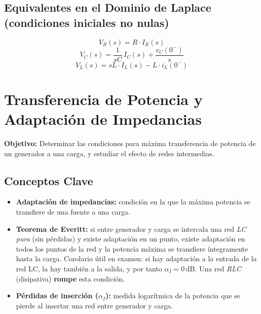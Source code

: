 \documentclass[12pt,a4paper]{article}
\begin{document}
\subsection{Equivalentes en el Dominio de Laplace (condiciones iniciales no nulas)}

\begin{formulabox}
\[
  V_R(s) = R\cdot I_R(s)
\]
\[
  V_C(s) = \frac{1}{sC}\,I_C(s) + \frac{v_C(0^-)}{s}
\]
\[
  V_L(s) = sL\cdot I_L(s) - L\cdot i_L(0^-)
\]
\end{formulabox}

\section{Transferencia de Potencia y Adaptación de Impedancias}

\textbf{Objetivo:} Determinar las condiciones para máxima transferencia de potencia
de un generador a una carga, y estudiar el efecto de redes intermedias.

\subsection{Conceptos Clave}

\begin{itemize}[leftmargin=1.5em, itemsep=4pt]
  \item \textbf{Adaptación de impedancias:} condición en la que la máxima potencia
        se transfiere de una fuente a una carga.

  \item \textbf{Teorema de Everitt:} si entre generador y carga se intercala una red
        \emph{LC pura} (sin pérdidas) y existe adaptación en un punto, existe adaptación
        en todos los puntos de la red y la potencia máxima se transfiere íntegramente
        hasta la carga. Corolario útil en examen: si hay adaptación a la entrada de
        la red LC, la hay también a la salida, y por tanto $\alpha_I = 0\,\text{dB}$.
        Una red \emph{RLC} (disipativa) \textbf{rompe} esta condición.

  \item \textbf{Pérdidas de inserción ($\alpha_I$):} medida logarítmica de la potencia
        que se pierde al insertar una red entre generador y carga.
\end{itemize}
\end{document}
